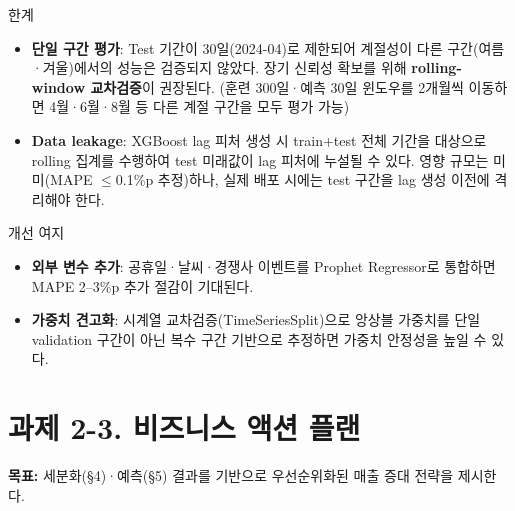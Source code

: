\documentclass[a4paper, 11pt]{article}
\begin{document}
\begin{warnbox}{한계}
\begin{itemize}[noitemsep, topsep=2pt]
  \item \textbf{단일 구간 평가}: Test 기간이 30일(2024-04)로 제한되어 계절성이 다른 구간(여름·겨울)에서의 성능은 검증되지 않았다.
        장기 신뢰성 확보를 위해 \textbf{rolling-window 교차검증}이 권장된다.
        (훈련 300일·예측 30일 윈도우를 2개월씩 이동하면 4월·6월·8월 등 다른 계절 구간을 모두 평가 가능)
  \item \textbf{Data leakage}: XGBoost lag 피처 생성 시 train+test 전체 기간을 대상으로 rolling 집계를 수행하여 test 미래값이 lag 피처에 누설될 수 있다.
        영향 규모는 미미(MAPE $\leq$0.1\%p 추정)하나, 실제 배포 시에는 test 구간을 lag 생성 이전에 격리해야 한다.
\end{itemize}
\end{warnbox}

\begin{infobox}{개선 여지}
\begin{itemize}[noitemsep, topsep=2pt]
  \item \textbf{외부 변수 추가}: 공휴일·날씨·경쟁사 이벤트를 Prophet Regressor로 통합하면 MAPE 2--3\%p 추가 절감이 기대된다.
  \item \textbf{가중치 견고화}: 시계열 교차검증(TimeSeriesSplit)으로 앙상블 가중치를 단일 validation 구간이 아닌 복수 구간 기반으로 추정하면 가중치 안정성을 높일 수 있다.
\end{itemize}
\end{infobox}

\newpage
\section{과제 2-3. 비즈니스 액션 플랜}

\textbf{목표:} 세분화(§4)·예측(§5) 결과를 기반으로 우선순위화된 매출 증대 전략을 제시한다.
\end{document}
